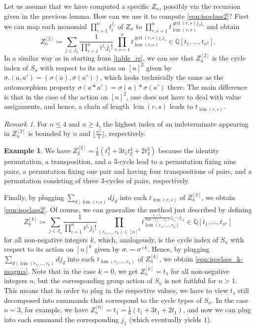 \documentclass[12pt]{article}
\let\Cref\crtCref
\DeclareMathOperator{\lcm}{lcm}
\theoremstyle{definition}
\newtheorem{example}[theorem]{Example}
\theoremstyle{remark}
\newtheorem*{remark}{Remark}
\begin{document}
	Let us assume that we have computed a specific $Z_n$, possibly via the recursion given in the previous lemma. How can we use it to compute \eqref{eqn:isoclass2}? First we can map each monomial $\prod_{i=1}^n t_i^{j_i}$ of $Z_n$ to $\prod_{r,s=1}^n t_{\lcm(r,s)}^{\gcd(r,s)j_rj_s}$ and obtain
	\[
	Z_n^{[2]}\coloneqq \sum_{j\in J_n} \frac{1}{\prod_{i=1}^n i^{j_i} j_i!} \prod_{r,s=1}^n t_{\lcm(r,s)}^{\gcd(r,s)j_rj_s} \in \mathbb Q[t_1,\dots,t_{n^2}].
	\]
	In a similar way as in \Cref{sec:pot} starting from \eqref{table_rs}, we can see that $Z_n^{[2]}$ is the cycle index of $S_n$ with respect to its action on $[n]^2$ given by $\sigma.(a,a') = (\sigma(a),\sigma(a'))$, which looks technically the same as the automorphism property $\sigma(a\ast a') = \sigma(a)\ast\sigma(a')$ there. The main difference is that in the case of the action on $[n]^2$, one does not have to deal with value assignments, and hence, a chain of length $\lcm(r,s)$ leads to $t_{\lcm(r,s)}$.
	\begin{remark}
		For $n\le4$ and $n\ge4$, the highest index of an indeterminate appearing in $Z_n^{[2]}$ is bounded by $n$ and $\big\lfloor\frac{n^2}4\big\rfloor$, respectively.
	\end{remark}
	\begin{example}
		We have $Z_3^{[2]} = \frac16(t_1^9+3t_1t_2^4+2t_3^3)$ because the identity permutation, a transposition, and a $3$-cycle lead to a permutation fixing nine pairs, a permutation fixing one pair and having four transpositions of pairs, and a permutation consisting of three $3$-cycles of pairs, respectively.
	\end{example}
	Finally, by plugging $\sum_{d\mid\lcm(r,s)} d j_d$ into each $t_{\lcm(r,s)}$ of $Z_n^{[2]}$, we obtain \eqref{eqn:isoclass2}. Of course, we can generalize the method just described by defining
	\begin{equation*}
		Z_n^{[k]}\coloneqq \sum_{j\in J_n} \frac{1}{\prod_{i=1}^n i^{j_i} j_i!} \prod_{(r_1,\dots,r_k)\in [n]^k} t_{\lcm(r_1,\dots,r_k)}^{\frac{r_1\cdots r_k}{\lcm(r_1,\dots,r_k)}j_{r_1}\cdots j_{r_k}} \in \mathbb Q[t_1,\dots,t_{n^k}]
	\end{equation*}
	for all non-negative integers $k$, which, analogously, is the cycle index of $S_n$ with respect to its action on $[n]^k$ given by $\sigma. = \sigma^{\times k}$. Hence, by plugging $\sum_{d\mid\lcm(r_1,\dots,r_k)} d j_d$ into each $t_{\lcm(r_1,\dots,r_k)}$ of $Z_n^{[k]}$, we obtain \eqref{eqn:isoclass_k-magma}. Note that in the case $k=0$, we get $Z_n^{[k]} = t_1$ for all non-negative integers $n$, but the corresponding group action of $S_n$ is not faithful for $n>1$. This means that in order to plug in the respective values, we have to view $t_1$ still decomposed into summands that correspond to the cycle types of $S_n$. In the case $n=3$, for example, we have $Z_n^{[0]} = t_1 = \frac16(t_1+3t_1+2t_1)$, and now we can plug into each summand the corresponding $j_1$ (which eventually yields $1$).
	
\end{document}
